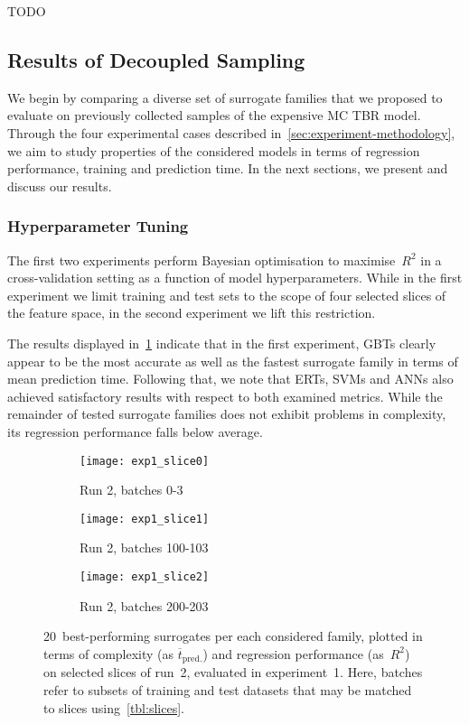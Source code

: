 TODO

\subsection{Results of Decoupled Sampling}
\label{sec:modelres}

We begin by comparing a diverse set of surrogate families that we proposed
to evaluate on previously collected samples of the expensive MC TBR model.
Through the four experimental cases described
in~\cref{sec:experiment-methodology}, we aim to study properties of the
considered models in terms of regression performance, training and prediction
time. In the next sections, we present and discuss our results.


\subsubsection{Hyperparameter Tuning}

The first two experiments perform Bayesian optimisation to maximise~$R^2$ in
a cross-validation setting as a function of model hyperparameters. While in the
first experiment we limit training and test sets to the scope of four selected
slices of the feature space, in the second experiment we lift this restriction.

The results displayed in~\cref{fig:exp1-time-vs-reg} indicate that in the first
experiment, GBTs clearly appear to be the most accurate as
well as the fastest surrogate family in terms of mean prediction time. Following
that, we note that ERTs, SVMs and ANNs also achieved satisfactory results with respect to both examined metrics.
While the remainder of tested surrogate families does not exhibit problems in
complexity, its regression performance falls below average.

\begin{figure}[h]
	\centering
	\begin{subfigure}[b]{0.333\textwidth}
		\centering
		\texttt{[image: exp1\_slice0]}
		\caption{Run 2, batches 0-3}
	\end{subfigure}\hfill%
	\begin{subfigure}[b]{0.333\textwidth}
		\centering
		\texttt{[image: exp1\_slice1]}
		\caption{Run 2, batches 100-103}
	\end{subfigure}\hfill%
	\begin{subfigure}[b]{0.333\textwidth}
		\centering
		\texttt{[image: exp1\_slice2]}
		\caption{Run 2, batches 200-203}
	\end{subfigure}
	\caption{20~best-performing surrogates per each considered family, plotted in
		terms of complexity (as $\overline{t}_{\text{pred.}}$) and regression
		performance (as~$R^2$) on selected slices of run~2, evaluated in
	experiment~1. Here, batches refer to subsets of training and test datasets that
	may be matched to slices using~\cref{tbl:slices}.}
	\label{fig:exp1-time-vs-reg}
\end{figure}

